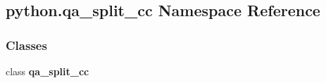 \subsection{python.\+qa\+\_\+split\+\_\+cc Namespace Reference}
\label{namespacepython_1_1qa__split__cc}
\subsubsection*{Classes}
\begin{DoxyCompactItemize}
\item 
class {\bf qa\+\_\+split\+\_\+cc}
\end{DoxyCompactItemize}
